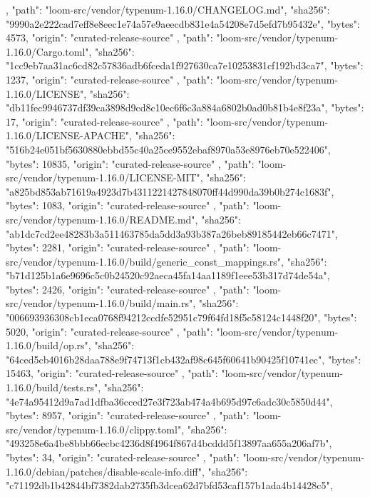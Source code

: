 {{    },
    {
      "path": "loom-src/vendor/typenum-1.16.0/CHANGELOG.md",
      "sha256": "9990a2e222cad7eff8e8eec1e74a57e9aeecdb831e4a54208e7d5efd7b95432e",
      "bytes": 4573,
      "origin": "curated-release-source"
    },
    {
      "path": "loom-src/vendor/typenum-1.16.0/Cargo.toml",
      "sha256": "1cc9eb7aa31ac6cd82c57836adb6fceda1f927630ca7e10253831cf192bd3ca7",
      "bytes": 1237,
      "origin": "curated-release-source"
    },
    {
      "path": "loom-src/vendor/typenum-1.16.0/LICENSE",
      "sha256": "db11fec9946737df39ca3898d9cd8c10ec6f6c3a884a6802b0ad0b81b4e8f23a",
      "bytes": 17,
      "origin": "curated-release-source"
    },
    {
      "path": "loom-src/vendor/typenum-1.16.0/LICENSE-APACHE",
      "sha256": "516b24e051bf5630880ebbd55c40a25ce9552ebaf8970a53e8976eb70e522406",
      "bytes": 10835,
      "origin": "curated-release-source"
    },
    {
      "path": "loom-src/vendor/typenum-1.16.0/LICENSE-MIT",
      "sha256": "a825bd853ab71619a4923d7b4311221427848070ff44d990da39b0b274c1683f",
      "bytes": 1083,
      "origin": "curated-release-source"
    },
    {
      "path": "loom-src/vendor/typenum-1.16.0/README.md",
      "sha256": "ab1dc7cd2ee48283b3a511463785da5dd3a93b387a26beb89185442eb66c7471",
      "bytes": 2281,
      "origin": "curated-release-source"
    },
    {
      "path": "loom-src/vendor/typenum-1.16.0/build/generic_const_mappings.rs",
      "sha256": "b71d125b1a6e9696c5c0b24520c92aeca45fa14aa1189f1eee53b317d74de54a",
      "bytes": 2426,
      "origin": "curated-release-source"
    },
    {
      "path": "loom-src/vendor/typenum-1.16.0/build/main.rs",
      "sha256": "006693936308cb1eca0768f94212ccdfe52951c79f64fd18f5c58124c1448f20",
      "bytes": 5020,
      "origin": "curated-release-source"
    },
    {
      "path": "loom-src/vendor/typenum-1.16.0/build/op.rs",
      "sha256": "64ced5cb4016b28daa788e9f74713f1cb432af98c645f60641b90425f10741ec",
      "bytes": 15463,
      "origin": "curated-release-source"
    },
    {
      "path": "loom-src/vendor/typenum-1.16.0/build/tests.rs",
      "sha256": "4e74a95412d9a7ad1dfba36cced27e3f723ab474a4b695d97c6adc30c5850d44",
      "bytes": 8957,
      "origin": "curated-release-source"
    },
    {
      "path": "loom-src/vendor/typenum-1.16.0/clippy.toml",
      "sha256": "493258e6a4be8bbb66ecbc4236d8f4964f867d4bcddd5f13897aa655a206af7b",
      "bytes": 34,
      "origin": "curated-release-source"
    },
    {
      "path": "loom-src/vendor/typenum-1.16.0/debian/patches/disable-scale-info.diff",
      "sha256": "c71192db1b42844bf7382dab2735fb3dcea62d7bfd53caf157b1ada4b14428c5",
}}
